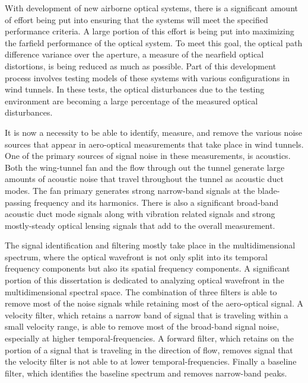 
With development of new airborne optical systems, there is a significant amount of effort being put into ensuring that the systems will meet the specified performance criteria.
A large portion of this effort is being put into maximizing the farfield performance of the optical system.
To meet this goal, the optical path difference variance over the aperture, a measure of the nearfield optical distortions, is being reduced as much as possible.
Part of this development process involves testing models of these systems with various configurations in wind tunnels.
In these tests, the optical disturbances due to the testing environment are becoming a large percentage of the measured optical disturbances.

It is now a necessity to be able to identify, measure, and remove the various noise sources that appear in aero-optical measurements that take place in wind tunnels.
One of the primary sources of signal noise in these measurements, is acoustics.
Both the wing-tunnel fan and the flow through out the tunnel generate large amounts of acoustic noise that travel throughout the tunnel as acoustic duct modes.
The fan primary generates strong narrow-band signals at the blade-passing frequency and its harmonics.
There is also a significant broad-band acoustic duct mode signals along with vibration related signals and strong mostly-steady optical lensing signals that add to the overall measurement.

The signal identification and filtering mostly take place in the multidimensional spectrum, where the optical wavefront is not only split into its temporal frequency components but also its spatial frequency components.
A significant portion of this dissertation is dedicated to analyzing optical wavefront in the multidimensional spectral space.
The combination of three filters is able to remove most of the noise signals while retaining most of the aero-optical signal.
A velocity filter, which retains a narrow band of signal that is traveling within a small velocity range, is able to remove most of the broad-band signal noise, especially at higher temporal-frequencies.
A forward filter, which retains on the portion of a signal that is traveling in the direction of flow, removes signal that the velocity filter is not able to at lower temporal-frequencies.
Finally a baseline filter, which identifies the baseline spectrum and removes narrow-band peaks.
